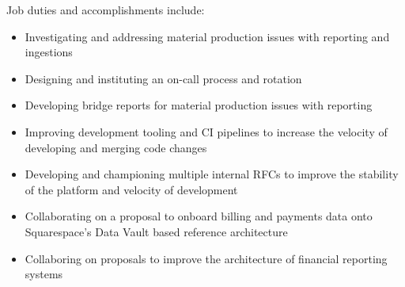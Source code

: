 \normalsize
Job duties and accomplishments include:
\small
\begin{itemize}
    \item Investigating and addressing material production issues with reporting
    and ingestions
    \item Designing and instituting an on-call process and rotation
    \item Developing bridge reports for material production issues with
    reporting
    \item Improving development tooling and CI pipelines to increase the
    velocity of developing and merging code changes
    \item Developing and championing multiple internal RFCs to improve the
    stability of the platform and velocity of development
    \item Collaborating on a proposal to onboard billing and payments data onto
    Squarespace's Data Vault based reference architecture
    \item Collaboring on proposals to improve the architecture of financial reporting systems
\end{itemize}
\normalsize
\medskip
